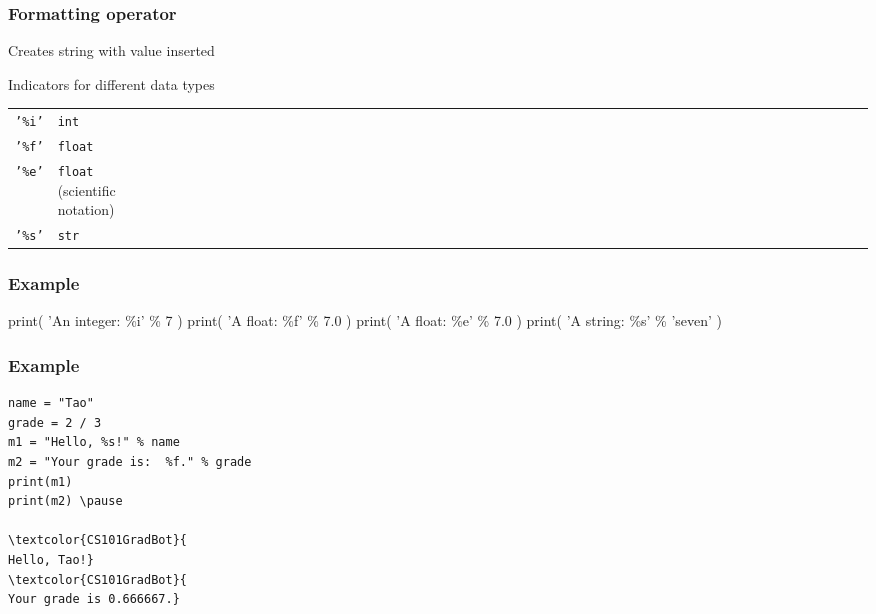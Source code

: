\documentclass[11pt]{beamer}
\begin{document}
\begin{frame}
  \frametitle{Formatting operator}
  \Enlarge

  \begin{itemize}
  \myitem  Creates string with value inserted
    \begin{itemize}
    \mysubitem  Indicators for different data types
      \begin{tabular}{*{27}{ll}}
        \texttt{'\%i'} & \texttt{int} \\
        \texttt{'\%f'} & \texttt{float} \\
        \texttt{'\%e'} & \texttt{float} (scientific notation) \\
        \texttt{'\%s'} & \texttt{str}
      \end{tabular}
    \end{itemize}
  \end{itemize}
\end{frame}

\begin{frame}[fragile]
  \frametitle{Example}
  \Enlarge

  \begin{semiverbatim}
print( 'An integer:  \%i' \% 7 )
print( 'A float:     \%f' \% 7.0 )
print( 'A float:     \%e' \% 7.0 )
print( 'A string:    \%s' \% 'seven' )
  \end{semiverbatim}
\end{frame}

\begin{frame}[fragile]
  \frametitle{Example}
  \Enlarge

  \begin{Verbatim}[commandchars=\\\{\}]
name = "Tao"
grade = 2 / 3
m1 = "Hello, %s!" % name
m2 = "Your grade is:  %f." % grade
print(m1)
print(m2) \pause

\textcolor{CS101GradBot}{
Hello, Tao!}
\textcolor{CS101GradBot}{
Your grade is 0.666667.} 
\end{Verbatim}

\end{frame} 
\end{document}
